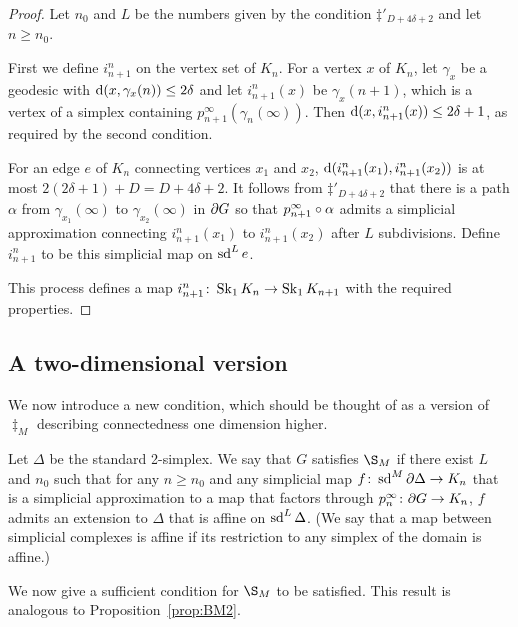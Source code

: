 \documentclass[a4paper]{article}
\begin{document}
\begin{proof}
  Let $n_0$ and $L$ be the numbers given by the condition $\ddag'_{D + 4\delta
  + 2}$ and let $n \geq n_0$.

  First we define $i^n_{n+1}$ on the vertex set of $K_n$. For a vertex $x$ of
  $K_n$, let $\gamma_x$ be a geodesic with $\operatorname{d}(x, \gamma_x(n)) \leq 2\delta$
  and let $i^n_{n+1}(x)$ be $\gamma_x(n+1)$, which is a vertex of a simplex
  containing $p^\infty_{n+1}(\gamma_n(\infty))$. Then $\operatorname{d}(x, i^n_{n+1}(x))
  \leq 2\delta + 1$, as required by the second condition.

  For an edge $e$ of $K_n$ connecting vertices $x_1$ and $x_2$,
  $\operatorname{d}(i^n_{n+1}(x_1), i^n_{n+1}(x_2))$ is at most $2(2\delta + 1) + D = D +
  4\delta + 2$. It follows from $\ddag'_{D+4\delta+2}$ that there is a path
  $\alpha$ from $\gamma_{x_1}(\infty)$ to $\gamma_{x_2}(\infty)$ in $\partial
  G$ so that $p^\infty_{n+1}\circ\alpha$ admits a simplicial approximation
  connecting $i^n_{n+1}(x_1)$ to $i^n_{n+1}(x_2)$ after $L$ subdivisions.
  Define $i^n_{n+1}$ to be this simplicial map on $\operatorname{sd}^L e$.

  This process defines a map $i^n_{n+1}\colon \operatorname{Sk}_1 K_n\to \operatorname{Sk}_1 K_{n+1}$
  with the required properties.
\end{proof}

\subsection{A two-dimensional version}

We now introduce a new condition, which should be thought of as a version of
$\ddag_M$ describing connectedness one dimension higher.

\begin{definition}
  Let $\Delta$ be the standard 2-simplex.  We say that $G$ satisfies $\S_M$ if
  there exist $L$ and $n_0$ such that for any $n\geq n_0$ and any simplicial
  map $f\colon \operatorname{sd}^M\partial\Delta \to K_n$ that is a simplicial approximation
  to a map that factors through $p^\infty_n \colon \partial G \to K_n$, $f$
  admits an extension to $\Delta$ that is affine on $\operatorname{sd}^L \Delta$. (We say
  that a map between simplicial complexes is affine if its restriction to any
  simplex of the domain is affine.)
\end{definition}

We now give a sufficient condition for $\S_M$ to be satisfied. This result is
analogous to Proposition~\ref{prop:BM2}.
\end{document}
